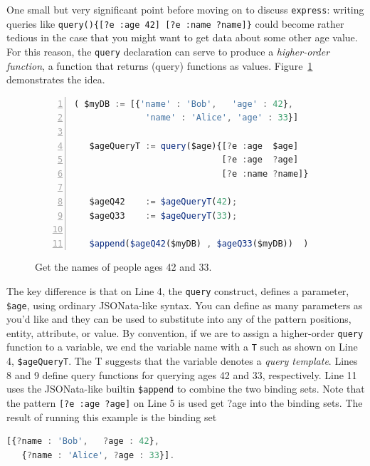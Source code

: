 \documentclass[9pt,letterpaper]{article}
\newcommand{\stt}[1]{\texttt{#1}} %
\begin{document}
One small but very significant point before moving on to discuss \stt{express}:
writing queries like \stt{query()\{[?e :age 42] [?e :name ?name]\}} could become rather tedious in the case that you might want to get data about some other age value.
For this reason, the \stt{query} declaration can serve to produce a \textit{higher-order function}, a function that returns (query) functions as values. Figure~\ref{code:higher-order-query} demonstrates the idea.


\begin{figure}[H]
    \caption{Get the names of people ages 42 and 33.}
    \label{code:higher-order-query}
\begin{lstlisting}[language=JavaScript,numberstyle=\scriptsize,basicstyle=\ttfamily\scriptsize,numbers=left,stepnumber=1,breaklines=true]
 ( $myDB := [{'name' : 'Bob',   'age' : 42},
              'name' : 'Alice', 'age' : 33}]

   $ageQueryT := query($age){[?e :age  $age]
                             [?e :age  ?age]
                             [?e :name ?name]}

   $ageQ42    := $ageQueryT(42);
   $ageQ33    := $ageQueryT(33);

   $append($ageQ42($myDB) , $ageQ33($myDB))  )
\end{lstlisting}
\end{figure} \vspace{-2em}

The key difference is that on Line 4, the \stt{query} construct, defines a parameter, \stt{\$age}, using ordinary JSONata-like syntax.
You can define as many parameters as you'd like and they can be used to substitute into any of the pattern positions, entity, attribute, or value.
By convention, if we are to assign a higher-order \stt{query} function to a variable, we end the variable name with a \stt{T} such as shown on Line 4, \stt{\$ageQueryT}.
The T suggests that the variable denotes a \textit{query template}.
Lines 8 and 9 define query functions for querying ages 42 and 33, respectively.
Line 11 uses the JSONata-like builtin \stt{\$append} to combine the two binding sets.
Note that the pattern \stt{[?e :age ?age]} on Line 5 is used get ?age into the binding sets.
The result of running this example is the binding set

\begin{lstlisting}[language=JavaScript,numbers=none,basicstyle=\ttfamily\scriptsize]
  [{?name : 'Bob',   ?age : 42},
   {?name : 'Alice', ?age : 33}].
\end{lstlisting} \vspace{-2em}
\end{document}
